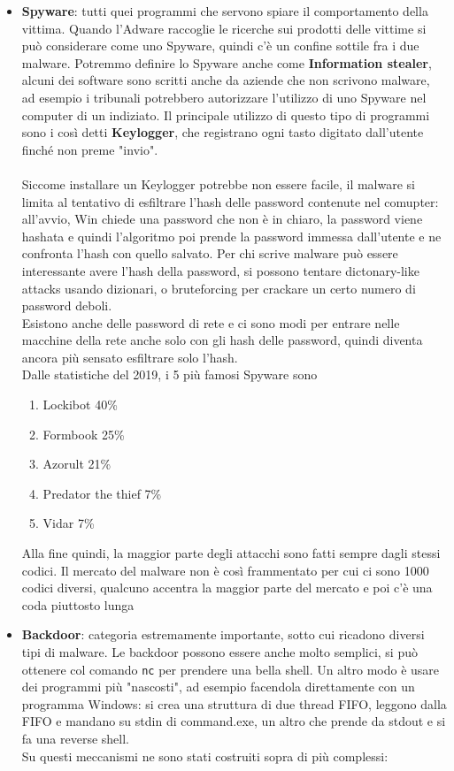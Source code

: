\documentclass[12pt, oneside]{extbook}
\begin{document}
\begin{itemize}
\item \textbf{Spyware}: tutti quei programmi che servono spiare il comportamento della vittima. Quando l'Adware raccoglie le ricerche sui prodotti delle vittime si può considerare come uno Spyware, quindi c'è un confine sottile fra i due malware. Potremmo definire lo Spyware anche come \textbf{Information stealer}, alcuni dei software sono scritti anche da aziende che non scrivono malware, ad esempio i tribunali potrebbero autorizzare l'utilizzo di uno Spyware nel computer di un indiziato. Il principale utilizzo di questo tipo di programmi sono i così detti \textbf{Keylogger}, che registrano ogni tasto digitato dall'utente finché non preme "invio". \\\\Siccome installare un Keylogger potrebbe non essere facile, il malware si limita al tentativo di esfiltrare l'hash delle password contenute nel comupter: all'avvio, Win chiede una password che non è in chiaro, la password viene hashata e quindi l'algoritmo poi prende la password immessa dall'utente e ne confronta l'hash con quello salvato. Per chi scrive malware può essere interessante avere l'hash della password, si possono tentare dictonary-like attacks usando dizionari, o bruteforcing per crackare un certo numero di password deboli.\\Esistono anche delle password di rete e ci sono modi per entrare nelle macchine della rete anche solo con gli hash delle password, quindi diventa ancora più sensato esfiltrare solo l'hash.\\Dalle statistiche del 2019, i 5 più famosi Spyware sono
\begin{enumerate}
\item Lockibot 40\%
\item Formbook 25\%
\item Azorult 21\%
\item Predator the thief 7\%
\item Vidar 7\%
\end{enumerate}
Alla fine quindi, la maggior parte degli attacchi sono fatti sempre dagli stessi codici. Il mercato del malware non è così frammentato per cui ci sono 1000 codici diversi, qualcuno accentra la maggior parte del mercato e poi c'è una coda piuttosto lunga
\item \textbf{Backdoor}: categoria estremamente importante, sotto cui ricadono diversi tipi di malware. Le backdoor possono essere anche molto semplici, si può ottenere col comando \texttt{nc} per prendere una bella shell. Un altro modo è usare dei programmi più "nascosti", ad esempio facendola direttamente con un programma Windows: si crea una struttura di due thread FIFO, leggono dalla FIFO e mandano su stdin di command.exe, un altro che prende da stdout e si fa una reverse shell.\\Su questi meccanismi ne sono stati costruiti sopra di più complessi:

\end{itemize}
\end{document}
